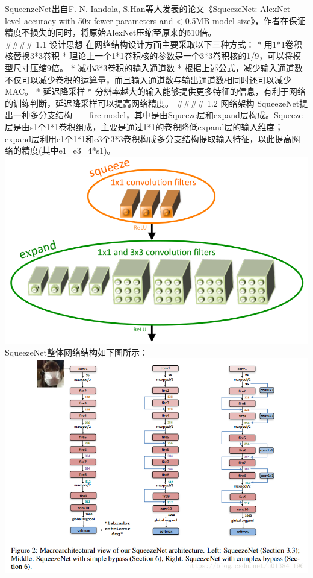 SqueenzeNet出自F. N. Iandola, S.Han等人发表的论文《SqueezeNet:
AlexNet-level accuracy with 50x fewer parameters and \textless{} 0.5MB
model
size》，作者在保证精度不损失的同时，将原始AlexNet压缩至原来的510倍。\\
\#\#\#\# 1.1 设计思想 在网络结构设计方面主要采取以下三种方式： *
用1*1卷积核替换3*3卷积 *
理论上一个1*1卷积核的参数是一个3*3卷积核的1/9，可以将模型尺寸压缩9倍。 *
减小3*3卷积的输入通道数 *
根据上述公式，减少输入通道数不仅可以减少卷积的运算量，而且输入通道数与输出通道数相同时还可以减少MAC。
* 延迟降采样 *
分辨率越大的输入能够提供更多特征的信息，有利于网络的训练判断，延迟降采样可以提高网络精度。
\#\#\#\# 1.2 网络架构 SqueezeNet提出一种多分支结构------fire
model，其中是由Squeeze层和expand层构成。Squeeze层是由s1个1*1卷积组成，主要是通过1*1的卷积降低expand层的输入维度；expand层利用e1个1*1和e3个3*3卷积构成多分支结构提取输入特征，以此提高网络的精度(其中e1=e3=4*s1)。
\includegraphics{./img/ch17/9.png} SqueezeNet整体网络结构如下图所示：
\includegraphics{./img/ch17/10.png}

